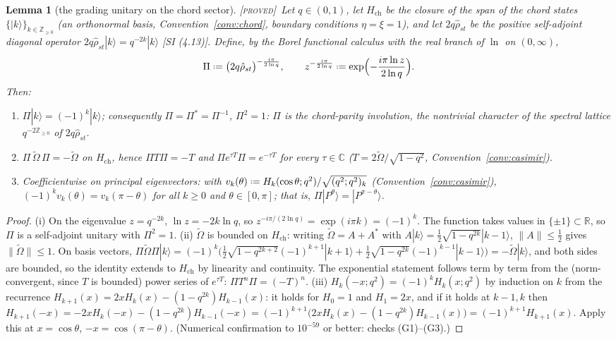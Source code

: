 \documentclass[11pt,a4paper]{article}
\providecommand{\coloneqq}{\mathrel{\vcenter{\baselineskip0.5ex \lineskiplimit0pt
      \hbox{\scriptsize.}\hbox{\scriptsize.}}}=}
\newcommand{\PROVED}{{\color{ForestGreen}\textsc{[proved]}}}
\theoremstyle{definition}
\theoremstyle{plain}
\newtheorem{lemma}[definition]{Lemma}
\newcommand{\tCas}{\tilde\Omega}                %
\newcommand{\Z}{\mathbb{Z}}
\newcommand{\C}{\mathbb{C}}
\newcommand{\R}{\mathbb{R}}
\newcommand{\ket}[1]{|#1\rangle}
\renewcommand{\P}{P}                            %
\begin{document}
\begin{lemma}[the grading unitary on the chord sector]\label{lem:gradingchord}
\PROVED\ Let $q\in(0,1)$, let $H_{\mathrm{ch}}$ be the closure of the span of the chord states
$\{\ket{k}\}_{k\in\Z_{\ge0}}$ (an orthonormal basis, Convention~\ref{conv:chord}, boundary
conditions $\eta=\xi=1$), and let $2q\hat\rho_{st}$ be the positive self-adjoint diagonal
operator $2q\hat\rho_{st}\ket{k}=q^{-2k}\ket{k}$ [SI (4.13)]. Define, by the Borel functional
calculus with the real branch of $\ln$ on $(0,\infty)$,
\begin{equation}\label{eq:Pidef}
  \Pi \coloneqq \bigl(2q\hat\rho_{st}\bigr)^{-\frac{i\pi}{2\ln q}},
  \qquad z^{-\frac{i\pi}{2\ln q}}\coloneqq\exp\Bigl(-\frac{i\pi\ln z}{2\ln q}\Bigr).
\end{equation}
Then:
\begin{enumerate}[label=(\roman*)]
\item $\Pi\ket{k}=(-1)^{k}\ket{k}$; consequently $\Pi=\Pi^{*}=\Pi^{-1}$, $\Pi^{2}=1$:
$\Pi$ is the chord-parity involution, the nontrivial character of the spectral lattice
$q^{-2\Z_{\ge0}}$ of $2q\hat\rho_{st}$.
\item $\Pi\,\tCas\,\Pi=-\tCas$ on $H_{\mathrm{ch}}$, hence $\Pi T\Pi=-T$ and
$\Pi e^{\tau T}\Pi=e^{-\tau T}$ for every $\tau\in\C$
($T=2\tCas/\sqrt{1-q^{2}}$, Convention~\ref{conv:casimir}).
\item Coefficientwise on principal eigenvectors: with
$v_{k}(\theta)\coloneqq H_{k}(\cos\theta;q^{2})/\sqrt{(q^{2};q^{2})_{k}}$
(Convention~\ref{conv:casimir}), $(-1)^{k}v_{k}(\theta)=v_{k}(\pi-\theta)$ for all
$k\ge0$ and $\theta\in[0,\pi]$; that is, $\Pi\ket{\P^{\theta}}=\ket{\P^{\pi-\theta}}$.
\end{enumerate}
\end{lemma}

\begin{proof}
(i) On the eigenvalue $z=q^{-2k}$, $\ln z=-2k\ln q$, so
$z^{-i\pi/(2\ln q)}=\exp(i\pi k)=(-1)^{k}$. The function takes values in $\{\pm1\}\subset\R$,
so $\Pi$ is a self-adjoint unitary with $\Pi^{2}=1$.
(ii) $\tCas$ is bounded on $H_{\mathrm{ch}}$: writing $\tCas=A+A^{*}$ with
$A\ket{k}=\tfrac12\sqrt{1-q^{2k}}\ket{k-1}$, $\|A\|\le\tfrac12$ gives $\|\tCas\|\le1$. On
basis vectors,
$\Pi\tCas\Pi\ket{k}
=(-1)^{k}\bigl(\tfrac12\sqrt{1-q^{2k+2}}(-1)^{k+1}\ket{k+1}
+\tfrac12\sqrt{1-q^{2k}}(-1)^{k-1}\ket{k-1}\bigr)=-\tCas\ket{k}$,
and both sides are bounded, so the identity extends to $H_{\mathrm{ch}}$ by linearity and
continuity. The exponential statement follows term by term from the (norm-convergent, since
$T$ is bounded) power series of $e^{\tau T}$: $\Pi T^{n}\Pi=(-T)^{n}$.
(iii) $H_{k}(-x;q^{2})=(-1)^{k}H_{k}(x;q^{2})$ by induction on $k$ from the recurrence
$H_{k+1}(x)=2xH_{k}(x)-(1-q^{2k})H_{k-1}(x)$: it holds for $H_{0}=1$ and $H_{1}=2x$, and if it
holds at $k-1,k$ then
$H_{k+1}(-x)=-2xH_{k}(-x)-(1-q^{2k})H_{k-1}(-x)
=(-1)^{k+1}\bigl(2xH_{k}(x)-(1-q^{2k})H_{k-1}(x)\bigr)=(-1)^{k+1}H_{k+1}(x)$. Apply this at
$x=\cos\theta$, $-x=\cos(\pi-\theta)$. (Numerical confirmation to $10^{-59}$ or better:
checks (G1)--(G3).)
\end{proof}
\end{document}
